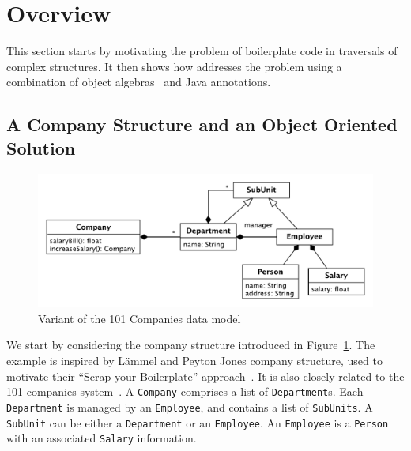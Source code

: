 \section{Overview}\label{subsec:overview}

This section starts by motivating the problem of boilerplate code in
traversals of complex structures. It then shows how \name addresses
the problem using a combination of object algebras~\cite{bruno12oa}
and Java annotations.



\subsection{A Company Structure and an Object Oriented Solution}

\begin{figure}[t]
\centering
\includegraphics[width=0.9\linewidth]{101companies}
\caption{Variant of the 101 Companies data model\label{company_structure}}
\end{figure}

We start by considering the company structure introduced in
Figure~\ref{company_structure}. The example is inspired by L\"ammel
and Peyton Jones company structure, used to motivate their ``Scrap
your Boilerplate'' approach~\cite{ralf03syb}. It is also closely
related to the 101 companies system~\cite{Inauguration101}.  A
\lstinline{Company} comprises a list of \lstinline{Department}s. Each
\lstinline{Department} is managed by an \lstinline{Employee}, and
contains a list of \lstinline{SubUnits}. A \lstinline{SubUnit} can be
either a \lstinline{Department} or an \lstinline{Employee}. An
\lstinline{Employee} is a \lstinline{Person} with an associated
\lstinline{Salary} information.


